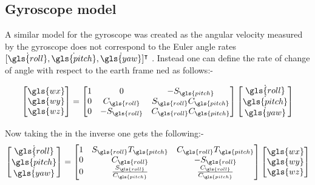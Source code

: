  \tocless\subsection{Gyroscope model}
A similar model for the gyroscope was created as the angular velocity measured by the gyroscope does not correspond to the Euler angle rates $[\dot{\gls{roll}},\dot{\gls{pitch}},\dot{\gls{yaw}}]^\intercal$ . Instead one can define the rate of change of angle with respect to the earth frame \gls{ned} as follows:-


\begin{equation}
\begin{bmatrix}																
\gls{wx}         			\\
\gls{wy} 	  \\
\gls{wz}
\end{bmatrix} =
\begin{bmatrix}																
1	& 0						 & -S_{\gls{pitch}}           			\\
0 	& C_{\gls{roll}}   & S_{\gls{roll}}C_{\gls{pitch}}   \\
0 	& -S_{\gls{roll}}  & C_{\gls{roll}}C_{\gls{pitch}}\end{bmatrix}
\begin{bmatrix}																
\dot{\gls{roll} }        			\\
\dot{\gls{pitch}} 	  \\
\dot{\gls{yaw}}\end{bmatrix}
\end{equation}

Now taking the in the inverse one gets the following:-
\begin{equation}
\begin{bmatrix}																
\dot{\gls{roll} }        			\\
\dot{\gls{pitch}} 	  \\
\dot{\gls{yaw}}
\end{bmatrix}
=
\begin{bmatrix}																
1	& S_{\gls{roll}}T_{\gls{pitch}}	 & C_{\gls{roll}}T_{\gls{pitch}}           			\\
0 	& C_{\gls{roll}}   & -S_{\gls{roll}}  \\
0 	& \frac{S_{\gls{roll}} }{C_{\gls{pitch}}} & \frac{C_{\gls{roll}}}{C_{\gls{pitch}}}
\end{bmatrix}
\begin{bmatrix}																
\gls{wx}         			\\
\gls{wy} 	  \\
\gls{wz}
\end{bmatrix} 
\label{Eq: angleur velocity from gyro}
\end{equation}

